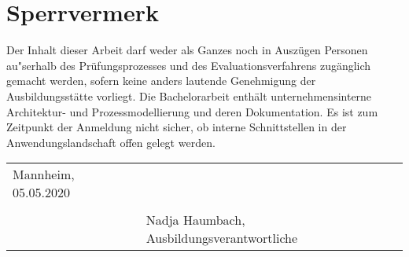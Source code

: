 \chapter*{Sperrvermerk}
Der Inhalt dieser Arbeit darf weder als Ganzes noch in Auszügen Personen au"serhalb des Prüfungsprozesses und des Evaluationsverfahrens zugänglich gemacht werden, sofern keine anders lautende Genehmigung der Ausbildungsstätte vorliegt. Die Bachelorarbeit enthält unternehmensinterne Architektur- und Prozessmodellierung und deren Dokumentation. Es ist zum Zeitpunkt der Anmeldung nicht sicher, ob interne Schnittstellen in der Anwendungslandschaft offen gelegt werden.



\vspace{3cm}
\begingroup
\begin{table}[h!]
	\setlength\tabcolsep{0pt}
	\begin{tabular}{p{6.5cm}p{8.5cm}}
		Mannheim, 05.05.2020 &  \\
		& \\
		& Nadja Haumbach, Ausbildungsverantwortliche \\
	\end{tabular}
\end{table}
